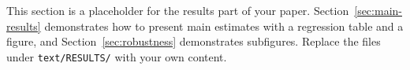 
This section is a placeholder for the results part of your paper.
Section~\ref{sec:main-results} demonstrates how to present main estimates
with a regression table and a figure, and Section~\ref{sec:robustness}
demonstrates subfigures. Replace the files under
\texttt{text/RESULTS/} with your own content.

